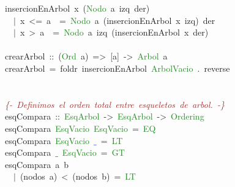 \begin{allintypewriter}
\mbox{}insercionEnArbol\ x\ \textcolor{BrickRed}{(}\textcolor{ForestGreen}{Nodo}\ a\ izq\ der\textcolor{BrickRed}{)} \\
\mbox{}\ \ \textcolor{BrickRed}{$|$}\ x\ \textcolor{BrickRed}{\textless{}=}\ a\ \ \textcolor{BrickRed}{=}\ \textcolor{ForestGreen}{Nodo}\ a\ \textcolor{BrickRed}{(}insercionEnArbol\ x\ izq\textcolor{BrickRed}{)}\ der \\
\mbox{}\ \ \textcolor{BrickRed}{$|$}\ x\ \textcolor{BrickRed}{\textgreater{}}\ a\ \ \textcolor{BrickRed}{=}\ \textcolor{ForestGreen}{Nodo}\ a\ izq\ \textcolor{BrickRed}{(}insercionEnArbol\ x\ der\textcolor{BrickRed}{)} \\
\mbox{} \\
\mbox{}crearArbol\ \textcolor{BrickRed}{::}\ \textcolor{BrickRed}{(}\textcolor{ForestGreen}{Ord}\ a\textcolor{BrickRed}{)}\ \textcolor{BrickRed}{=\textgreater{}}\ \textcolor{BrickRed}{[}a\textcolor{BrickRed}{]}\ \textcolor{BrickRed}{-\textgreater{}}\ \textcolor{ForestGreen}{Arbol}\ a \\
\mbox{}crearArbol\ \textcolor{BrickRed}{=}\ foldr\ insercionEnArbol\ \textcolor{ForestGreen}{ArbolVacio}\ \textcolor{BrickRed}{.}\ reverse \\
\mbox{} \\
\mbox{} \\
\mbox{}\textit{\textcolor{Brown}{\{-\ Definimos\ el\ orden\ total\ entre\ esqueletos\ de\ arbol.\ -\}}} \\
\mbox{}esqCompara\ \textcolor{BrickRed}{::}\ \textcolor{ForestGreen}{EsqArbol}\ \textcolor{BrickRed}{-\textgreater{}}\ \textcolor{ForestGreen}{EsqArbol}\ \textcolor{BrickRed}{-\textgreater{}}\ \textcolor{ForestGreen}{Ordering} \\
\mbox{}esqCompara\ \textcolor{ForestGreen}{EsqVacio}\ \textcolor{ForestGreen}{EsqVacio}\ \textcolor{BrickRed}{=}\ \textcolor{ForestGreen}{EQ} \\
\mbox{}esqCompara\ \textcolor{ForestGreen}{EsqVacio}\ \textbf{\textcolor{Blue}{$\_$}}\ \textcolor{BrickRed}{=}\ \textcolor{ForestGreen}{LT} \\
\mbox{}esqCompara\ \textbf{\textcolor{Blue}{$\_$}}\ \textcolor{ForestGreen}{EsqVacio}\ \textcolor{BrickRed}{=}\ \textcolor{ForestGreen}{GT} \\
\mbox{}esqCompara\ a\ b\  \\
\mbox{}\ \ \textcolor{BrickRed}{$|$}\ \textcolor{BrickRed}{(}nodos\ a\textcolor{BrickRed}{)}\ \textcolor{BrickRed}{\textless{}}\ \textcolor{BrickRed}{(}nodos\ b\textcolor{BrickRed}{)}\ \textcolor{BrickRed}{=}\ \textcolor{ForestGreen}{LT} \\

\end{allintypewriter}

